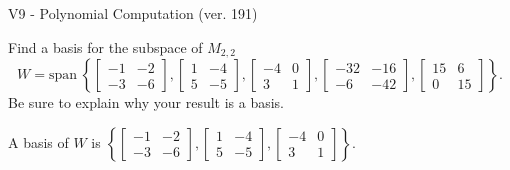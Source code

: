 \begin{exercise}
  \begin{exerciseTitle}V9 - Polynomial Computation (ver. 191)\end{exerciseTitle}
  \begin{exerciseStatement}
    Find a basis for the subspace of \(M_{2,2}\) 
\[W=\mathrm{span}\ \left\{\left[\begin{array}{cc}
-1 & -2 \\
-3 & -6
\end{array}\right] , \left[\begin{array}{cc}
1 & -4 \\
5 & -5
\end{array}\right] , \left[\begin{array}{cc}
-4 & 0 \\
3 & 1
\end{array}\right] , \left[\begin{array}{cc}
-32 & -16 \\
-6 & -42
\end{array}\right] , \left[\begin{array}{cc}
15 & 6 \\
0 & 15
\end{array}\right]\right\}.\]
 Be sure to explain why your result is a basis.


  \end{exerciseStatement}
  \begin{exerciseAnswer}
   A basis of \(W\) is  \(\left\{\left[\begin{array}{cc}
-1 & -2 \\
-3 & -6
\end{array}\right] , \left[\begin{array}{cc}
1 & -4 \\
5 & -5
\end{array}\right] , \left[\begin{array}{cc}
-4 & 0 \\
3 & 1
\end{array}\right]\right\}\).
  


  \end{exerciseAnswer}
\end{exercise}